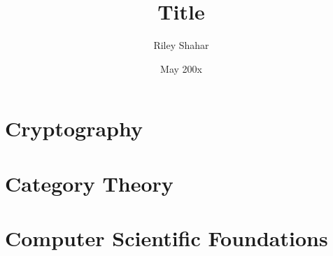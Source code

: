 \documentclass[12pt,twoside]{reedthesis}
\title{Title} %
\author{Riley Shahar}
\date{May 200x} %
\begin{document}
\maketitle
\frontmatter
\pagestyle{empty} %




\tableofcontents



\mainmatter%
\pagestyle{fancyplain} %


\chapter{Cryptography}


\chapter{Category Theory}


\appendix
\chapter{Computer Scientific Foundations}


\backmatter{}
\nocite{*}
\printbibliography


\end{document}
